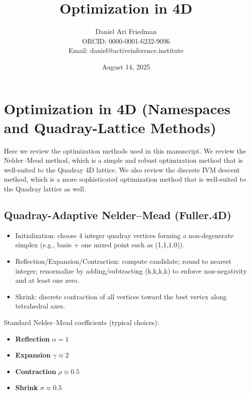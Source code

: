 \documentclass[
  10pt,
]{article}
\title{Optimization in 4D}
\author{Daniel Ari Friedman\\ ORCID: 0000-0001-6232-9096\\ Email: daniel@activeinference.institute}
\date{August 14, 2025}
\providecommand{\tightlist}{%
  \setlength{\itemsep}{0pt}\setlength{\parskip}{0pt}}
\begin{document}
\maketitle

{
\hypersetup{linkcolor=red}
\setcounter{tocdepth}{3}
\tableofcontents
}
\hypertarget{optimization-in-4d-namespaces-and-quadray-lattice-methods}{%
\section{Optimization in 4D (Namespaces and Quadray-Lattice
Methods)}\label{optimization-in-4d-namespaces-and-quadray-lattice-methods}}

Here we review the optimization methods used in this manuscript. We
review the Nelder--Mead method, which is a simple and robust
optimization method that is well-suited to the Quadray 4D lattice. We
also review the discrete IVM descent method, which is a more
sophisticated optimization method that is well-suited to the Quadray
lattice as well.

\hypertarget{quadray-adaptive-neldermead-fuller.4d}{%
\subsection{Quadray-Adaptive Nelder--Mead
(Fuller.4D)}\label{quadray-adaptive-neldermead-fuller.4d}}

\begin{itemize}
\tightlist
\item
  Initialization: choose 4 integer quadray vertices forming a
  non-degenerate simplex (e.g., basis + one mixed point such as
  (1,1,1,0)).
\item
  Reflection/Expansion/Contraction: compute candidate; round to nearest
  integer; renormalize by adding/subtracting (k,k,k,k) to enforce
  non-negativity and at least one zero.
\item
  Shrink: discrete contraction of all vertices toward the best vertex
  along tetrahedral axes.
\end{itemize}

Standard Nelder--Mead coefficients (typical choices):

\begin{itemize}
\tightlist
\item
  \textbf{Reflection} \(\alpha = 1\)
\item
  \textbf{Expansion} \(\gamma \approx 2\)
\item
  \textbf{Contraction} \(\rho \approx 0.5\)
\item
  \textbf{Shrink} \(\sigma \approx 0.5\)
\end{itemize}
\end{document}
